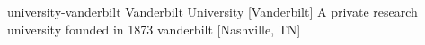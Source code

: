 \newglsXinstitution%
{university-vanderbilt}%
{Vanderbilt University}%
[Vanderbilt]%
{A private research university founded in 1873 \cite{website:Vanderbilt}}%
{vanderbilt}%
[Nashville, TN]%